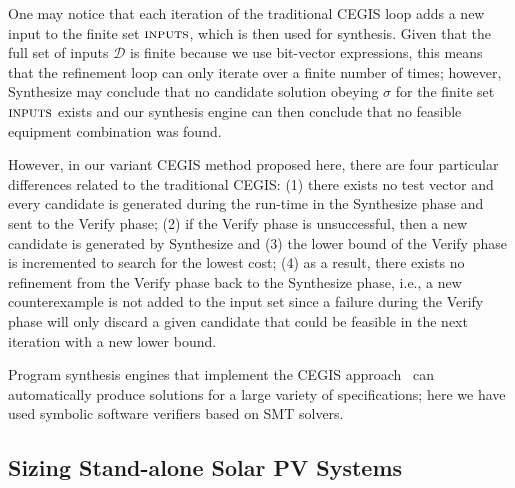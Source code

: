 \documentclass[review]{elsarticle}
\begin{document}
One may notice that each iteration of the traditional CEGIS loop adds a new input to the finite set $\text{\sc inputs}$, which is then used for synthesis.  Given that the full set of inputs $\mathcal{D}$ is finite because we use bit-vector expressions, this means that the refinement loop can only iterate over a finite number of times; however, {\sc Synthesize} may conclude that no candidate solution obeying $\sigma$ for the finite set $\text{\sc inputs}$ exists and our synthesis engine can then conclude that no feasible equipment combination was found.

However, in our variant CEGIS method proposed here, there are four particular differences related to the traditional CEGIS: 
(1) there exists no test vector and every candidate is generated during the run-time in the {\sc Synthesize} phase and sent to the {\sc Verify} phase; 
(2) if the {\sc Verify} phase is unsuccessful, then a new candidate is generated by {\sc Synthesize} and 
(3) the lower bound of the {\sc Verify} phase is incremented to search for the lowest cost; 
(4) as a result, there exists no refinement from the {\sc Verify} phase back to the {\sc Synthesize} phase, i.e., 
a new counterexample is not added to the {\sc input} set since a failure during the {\sc Verify} phase will only discard 
a given candidate that could be feasible in the next iteration with a new lower bound.

Program synthesis engines that implement the CEGIS approach~\cite{sketch} can automatically produce solutions for a large variety of specifications; here we have used symbolic software verifiers based on SMT solvers.

\subsection{Sizing Stand-alone Solar PV Systems}
\label{sec:sizing}
\end{document}

